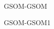 \setcounter{curtask}{1}


\begin{task}
    GSOM-GSOM
\end{task}

\begin{task}
    GSOM-GSOM1
\end{task}
